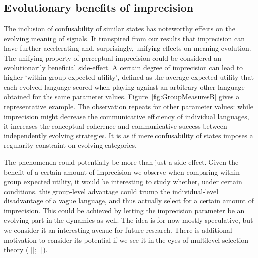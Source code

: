 \documentclass[12pt,english]{article}
\numberwithin{equation}{section}
\newcommand{\citealtbjps}[1]{\citeauthor{#1} [\citeyear{#1}]}
\begin{document}

\subsection{Evolutionary benefits of imprecision}
The inclusion of confusability of similar states has noteworthy effects on the evolving meaning
of signals.  It transpired from our results that imprecision can have further accelerating and,
surprisingly, unifying effects on meaning evolution.  The unifying property of perceptual
imprecision could be considered an evolutionarily beneficial side-effect. A certain degree of
imprecision can lead to higher `within group expected utility', defined as the average
expected utility that each evolved language scored when playing against an arbitrary other
language obtained for the same parameter values. Figure~\ref{fig:GroupMeasuresB} gives a
representative example. The observation repeats for other parameter values: while imprecision
might decrease the communicative efficiency of individual languages, it increases the
conceptual coherence and communicative success between independently evolving strategies. It is
as if mere confusability of states imposes a regularity constraint on evolving categories.

The phenomenon could potentially be more than just a side effect.  Given the benefit of a certain
amount of imprecision we observe when comparing within group expected utility, it would be
interesting to study whether, under certain conditions, this group-level advantage could trump
the individual-level disadvantage of a vague language, and thus actually select for a certain
amount of imprecision.  This could be achieved by letting the imprecision parameter be an
evolving part in the dynamics as well. The idea is for now mostly speculative, but we consider
it an interesting avenue for future research.  There is additional motivation to consider its
potential if we see it in the eyes of multilevel selection theory
(\citealtbjps{Wilson1994}; \citealtbjps{OGorman2008}).
\end{document}
